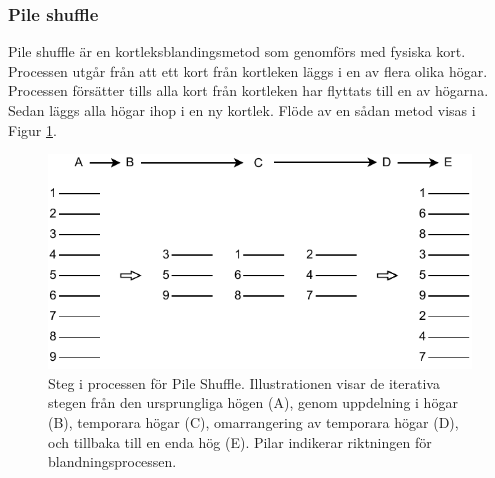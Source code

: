 \documentclass[swedish,a4paper]{article}
\begin{document}

\subsubsection{Pile shuffle}
\label{sec:pile_shuffle}
Pile shuffle är en kortleksblandingsmetod som genomförs med fysiska
kort. Processen utgår från att ett kort
från kortleken läggs i en av flera olika högar. Processen försätter
tills alla kort från kortleken har flyttats till en av högarna. Sedan
läggs  alla högar ihop i en ny kortlek. Flöde av en sådan metod visas i Figur
\ref{fig:pile_shuffle}.


\begin{figure}[H]
	\begin{center}
		\includegraphics{images/pile_shuffle.pdf}
	\end{center}
	\captionsetup{justification=centering,margin=4cm}
	\caption{Steg i processen för Pile Shuffle. Illustrationen visar de
	iterativa stegen från den ursprungliga högen (A), genom uppdelning i
	högar (B), temporara högar (C), omarrangering av temporara högar (D),
	och tillbaka till en enda hög (E). Pilar indikerar riktningen för
	blandningsprocessen.
	}
	\label{fig:pile_shuffle}
\end{figure}
\end{document}
